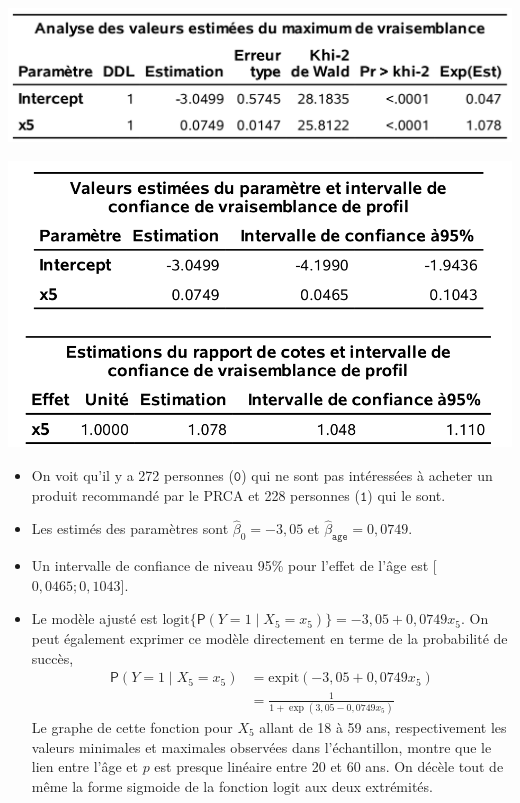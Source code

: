 \documentclass[
  11pt,
  letterpaper,
]{book}
\providecommand{\tightlist}{%
  \setlength{\itemsep}{0pt}\setlength{\parskip}{0pt}}
\theoremstyle{definition}
\theoremstyle{definition}
\theoremstyle{definition}
\theoremstyle{remark}
\begin{document}
\begin{center}\includegraphics[width=0.8\linewidth]{figures/03-logistic-e3} \end{center}

\begin{center}\includegraphics[width=0.8\linewidth]{figures/03-logistic-e4} \end{center}

\begin{itemize}
\tightlist
\item
  On voit qu'il y a 272 personnes (\(\texttt{0}\)) qui ne sont pas intéressées à acheter un produit recommandé par le PRCA et 228 personnes (\(\texttt{1}\)) qui le sont.
\item
  Les estimés des paramètres sont \(\widehat{\beta}_0 = -3,05\) et \(\widehat{\beta}_{\texttt{age}}=0,0749\).
\item
  Un intervalle de confiance de niveau 95\% pour l'effet de l'âge est {[}\(0,0465; 0,1043\){]}.
\item
  Le modèle ajusté est \(\mathrm{logit}\{{\mathsf P}\left(Y=1 \mid X_5=x_5\right)\} = -3,05 + 0,0749 x_5\). On peut également exprimer ce modèle directement en terme de la probabilité de succès,
  \begin{align*}
  {\mathsf P}\left(Y=1 \mid X_5=x_5\right) &= \mathrm{expit}(-3,05 + 0,0749 x_5) \\&= \frac{1}{1+\exp(3,05 - 0,0749 x_5)}
  \end{align*}
  Le graphe de cette fonction pour \(X_5\) allant de 18 à 59 ans, respectivement les valeurs minimales et maximales observées dans l'échantillon, montre que le lien entre l'âge et \(p\) est presque linéaire entre 20 et 60 ans. On décèle tout de même la forme sigmoide de la fonction \(\mathrm{logit}\) aux deux extrémités.
\end{itemize}
\end{document}
